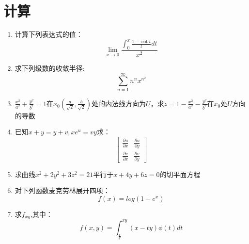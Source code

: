 \documentclass[12pt,a4paper]{article}
\begin{document}
	\section*{计算}
	\begin{enumerate}
		\item 计算下列表达式的值：
		\begin{equation*}
		\lim\limits_{x \to 0} \dfrac{\int_{0}^{x} \frac{1-\cot t}{t} dt}{x^2}
		\end{equation*}
		
		\item 求下列级数的收敛半径:
		\begin{equation*}
			\sum\limits_{n=1}^{\infty} n^nx^{n^2}
		\end{equation*}
		
		\item $\frac{x^2}{a^2}+\frac{y^2}{b^2}=1$在$x_0(\frac{a}{\sqrt{2}},\frac{b}{\sqrt{2}})$处的内法线方向为$U$，求$z=1-\frac{x^2}{a^2}-\frac{y^2}{b^2}$在$x_0$处$U$方向的导数
		
		\item 已知$x+y=y+v,xe^u=vy$求：
		\[
		\begin{bmatrix}
			\frac{\partial u}{\partial x} & \frac{\partial u}{\partial y} \\
			\frac{\partial v}{\partial x} & \frac{\partial v}{\partial y}
		\end{bmatrix}
		\]
		
		\item 求曲线$x^2+2y^2+3z^2=21$平行于$x+4y+6z=0$的切平面方程
		
		\item 对下列函数麦克劳林展开四项：
		\begin{equation*}
			f(x)=log(1+e^x)
		\end{equation*}
		
		\item 求$f_{xy}$,其中：
		\begin{equation*}
			f(x,y)=\int_{\frac{x}{y}}^{xy}(x-ty)\phi (t)dt
		\end{equation*}
		
		
	\end{enumerate}
	
	
	
	
\end{document}
